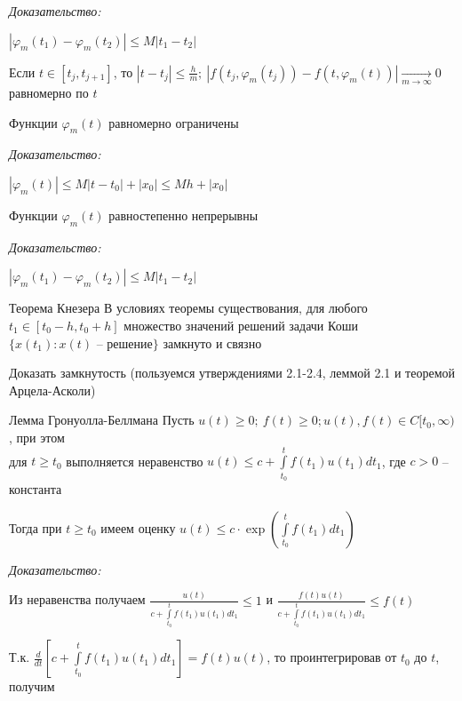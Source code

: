 \documentclass[12pt]{article}
\begin{document}
\textit{Доказательство:}

$|\varphi_m(t_1) - \varphi_m(t_2)| \leq M|t_1 - t_2|$

Если $t \in [t_j, t_{j + 1}]$, то $|t - t_j| \leq \frac{h}{m};\ |f(t_j, \varphi_m(t_j)) - f(t, \varphi_m(t))| \xrightarrow[m \to \infty]{} 0$ равномерно по $t$ 

\begin{propos}{}
    Функции $\varphi_m(t)$ равномерно ограничены 
\end{propos}

\textit{Доказательство:}

$|\varphi_m(t)| \leq M|t - t_0| + |x_0| \leq Mh + |x_0|$

\begin{propos}{}
    Функции $\varphi_m(t)$ равностепенно непрерывны
\end{propos}

\textit{Доказательство:}

$|\varphi_m(t_1) - \varphi_m(t_2)| \leq M|t_1 - t_2|$

\begin{theo}{Теорема Кнезера}
    В условиях теоремы существования, для любого $t_1 \in [t_0 - h, t_0 + h]$ множество значений решений задачи Коши $\{x(t_1) : x(t)\text{ -- решение}\}$ замкнуто и связно
\end{theo}

\begin{Exercise}{}
    Доказать замкнутость (пользуемся утверждениями 2.1-2.4, леммой 2.1 и теоремой Арцела-Асколи)
\end{Exercise}

\begin{lem}{Лемма Гронуолла-Беллмана}
    Пусть $u(t) \geq 0;\ f(t) \geq 0; u(t), f(t) \in C[t_0, \infty)$, при этом \\
    для $t \geq t_0$ выполняется неравенство $u(t) \leq c + \int\limits_{t_0}^t f(t_1)u(t_1)dt_1$, где $c > 0$ -- константа

    Тогда при $t \geq t_0$ имеем оценку $u(t) \leq c \cdot \exp(\int\limits_{t_0}^t f(t_1)dt_1)$
\end{lem}

\textit{Доказательство:}

Из неравенства получаем $\frac{u(t)}{c + \int\limits_{t_0}^t f(t_1)u(t_1)dt_1} \leq 1$ и $\frac{f(t)u(t)}{c + \int\limits_{t_0}^t f(t_1)u(t_1)dt_1} \leq f(t)$

Т.к. $\frac{d}{dt}\left[ c + \int\limits_{t_0}^t f(t_1) u(t_1)dt_1 \right] = f(t)u(t)$, то проинтегрировав от $t_0$ до $t$, получим 
\end{document}
